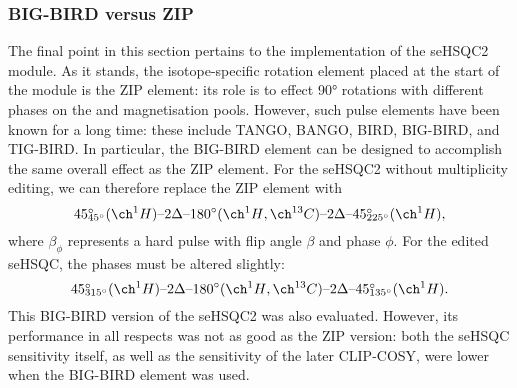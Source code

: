 \subsubsection{BIG-BIRD versus ZIP}

The final point in this section pertains to the implementation of the seHSQC2 module.
As it stands, the isotope-specific rotation element placed at the start of the module is the ZIP element: its role is to effect \ang{90} rotations with different phases on the  and  magnetisation pools.
However, such pulse elements have been known for a long time: these include TANGO\autocite{Wimperis1984JMR}, BANGO\autocite{Sorensen1994BMR}, BIRD\autocite{Garbow1982CPL,Uhrin1993JMRSA,Kaltschnee2014CC}, BIG-BIRD\autocite{Briand1997JMR}, and TIG-BIRD\autocite{Briand1998JMR}.
In particular, the BIG-BIRD element can be designed to accomplish the same overall effect as the ZIP element.
For the seHSQC2 without multiplicity editing, we can therefore replace the ZIP element with
\begin{equation}
    \label{eq:big_bird_unedited}
    45\rlap{\unit{\degree}}_{\ang{45}}(\proton{})\text{--}2\Delta\text{--}\ang{180}(\proton{},\carbon{})\text{--}2\Delta\text{--}45\rlap{\unit{\degree}}_{\ang{225}}(\proton{}),
\end{equation}
where $\beta_\phi$ represents a hard pulse with flip angle $\beta$ and phase $\phi$.
For the edited seHSQC, the phases must be altered slightly:
\begin{equation}
    \label{eq:big_bird_edited}
    45\rlap{\unit{\degree}}_{\ang{315}}(\proton{})\text{--}2\Delta\text{--}\ang{180}(\proton{},\carbon{})\text{--}2\Delta\text{--}45\rlap{\unit{\degree}}_{\ang{135}}(\proton{}).
\end{equation}
This BIG-BIRD version of the seHSQC2 was also evaluated.
However, its performance in all respects was not as good as the ZIP version: both the seHSQC sensitivity itself, as well as the sensitivity of the later CLIP-COSY, were lower when the BIG-BIRD element was used.

